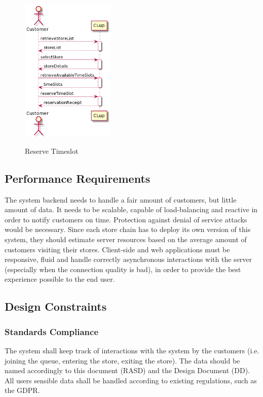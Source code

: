 \begin{figure}[H]
    \centering
    \includegraphics[width=0.4\textwidth]{uml/reserve_timeslot.png}
    \label{fig:seqdiag-reserve-timeslot}
    \caption{Reserve Timeslot}
\end{figure}
\subsection{Performance Requirements}
The system backend needs to handle a fair amount of customers, but little amount of data. It needs to be scalable, capable of load-balancing and reactive in order to notify customers on time. Protection against denial of service attacks would be necessary.
Since each store chain has to deploy its own version of this system, they should estimate server resources based on the average amount of customers visiting their stores.
Client-side and web applications must be responsive, fluid and handle correctly asynchronous interactions with the server (especially when the connection quality is bad), in order to provide the best experience possible to the end user.

\subsection{Design Constraints}
\subsubsection{Standards Compliance}
The system shall keep track of interactions with the system by the customers (i.e. joining the queue, entering the store, exiting the store).
The data should be named accordingly to this document (RASD) and the Design Document (DD).
All users sensible data shall be handled according to existing regulations, such as the GDPR.

